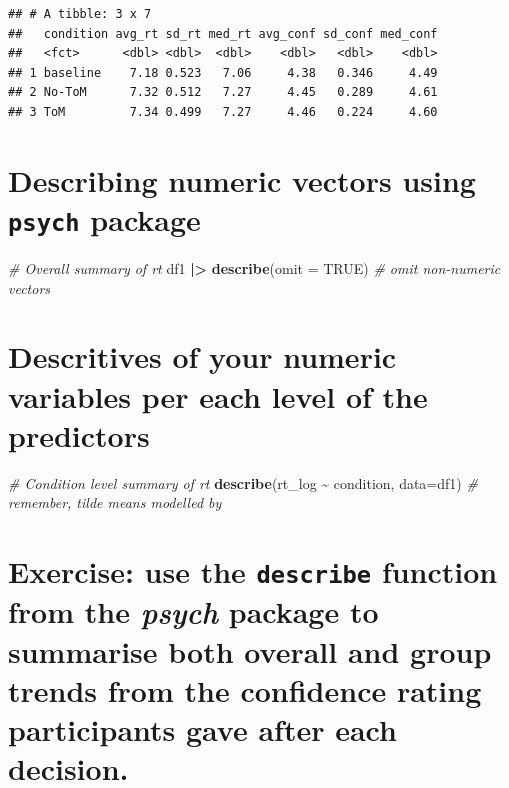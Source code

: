 \documentclass[
]{article}
\newenvironment{Shaded}{\begin{snugshade}}{\end{snugshade}}
\newcommand{\AttributeTok}[1]{\textcolor[rgb]{0.13,0.29,0.53}{#1}}
\newcommand{\CommentTok}[1]{\textcolor[rgb]{0.56,0.35,0.01}{\textit{#1}}}
\newcommand{\ConstantTok}[1]{\textcolor[rgb]{0.56,0.35,0.01}{#1}}
\newcommand{\FunctionTok}[1]{\textcolor[rgb]{0.13,0.29,0.53}{\textbf{#1}}}
\newcommand{\NormalTok}[1]{#1}
\newcommand{\SpecialCharTok}[1]{\textcolor[rgb]{0.81,0.36,0.00}{\textbf{#1}}}
\begin{document}
\begin{verbatim}
## # A tibble: 3 x 7
##   condition avg_rt sd_rt med_rt avg_conf sd_conf med_conf
##   <fct>      <dbl> <dbl>  <dbl>    <dbl>   <dbl>    <dbl>
## 1 baseline    7.18 0.523   7.06     4.38   0.346     4.49
## 2 No-ToM      7.32 0.512   7.27     4.45   0.289     4.61
## 3 ToM         7.34 0.499   7.27     4.46   0.224     4.60
\end{verbatim}

\hypertarget{describing-numeric-vectors-using-psych-package}{%
\section{\texorpdfstring{Describing numeric vectors using \texttt{psych}
package}{Describing numeric vectors using psych package}}\label{describing-numeric-vectors-using-psych-package}}

\begin{Shaded}
\begin{Highlighting}[]
\CommentTok{\# Overall summary of rt}
\NormalTok{df1 }\SpecialCharTok{|\textgreater{}}
  \FunctionTok{describe}\NormalTok{(}\AttributeTok{omit =} \ConstantTok{TRUE}\NormalTok{) }\CommentTok{\# omit non{-}numeric vectors}
\end{Highlighting}
\end{Shaded}

\hypertarget{descritives-of-your-numeric-variables-per-each-level-of-the-predictors}{%
\section{Descritives of your numeric variables per each level of the
predictors}\label{descritives-of-your-numeric-variables-per-each-level-of-the-predictors}}

\begin{Shaded}
\begin{Highlighting}[]
\CommentTok{\# Condition level summary of rt}
\FunctionTok{describe}\NormalTok{(rt\_log }\SpecialCharTok{\textasciitilde{}}\NormalTok{ condition, }\AttributeTok{data=}\NormalTok{df1) }\CommentTok{\# remember, tilde means modelled by}
\end{Highlighting}
\end{Shaded}

\hypertarget{exercise-use-the-describe-function-from-the-psych-package-to-summarise-both-overall-and-group-trends-from-the-confidence-rating-participants-gave-after-each-decision.}{%
\section{\texorpdfstring{Exercise: use the \texttt{describe} function
from the \emph{psych} package to summarise both overall and group trends
from the confidence rating participants gave after each
decision.}{Exercise: use the describe function from the psych package to summarise both overall and group trends from the confidence rating participants gave after each decision.}}\label{exercise-use-the-describe-function-from-the-psych-package-to-summarise-both-overall-and-group-trends-from-the-confidence-rating-participants-gave-after-each-decision.}}
\end{document}
